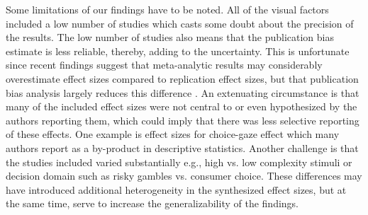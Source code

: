 Some limitations of our findings have to be noted. All of the visual factors included a low number of studies which casts some doubt about the precision of the results. The low number of studies also means that the publication bias estimate is less reliable, thereby, adding to the uncertainty. This is unfortunate since recent findings suggest that meta-analytic results may considerably overestimate effect sizes compared to replication effect sizes, but that publication bias analysis largely reduces this difference \citep{kvarven2020}. An extenuating circumstance is that many of the included effect sizes were not central to or even hypothesized by the authors reporting them, which could imply that there was less selective reporting of these effects. One example is effect sizes for choice-gaze effect which many authors report as a by-product in descriptive statistics. Another challenge is that the studies included varied substantially e.g., high vs. low complexity stimuli or decision domain such as risky gambles vs. consumer choice. These differences may have introduced additional heterogeneity in the synthesized effect sizes, but at the same time, serve to increase the generalizability of the findings.  \\ 


